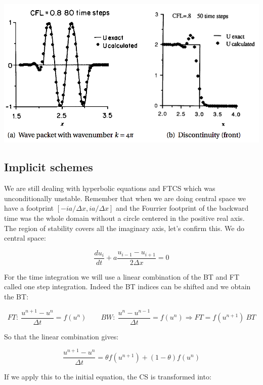 \begin{center}
\includegraphics[scale=0.5]{ch3/13}
\end{center}


\subsection{Implicit schemes}
We are still dealing with hyperbolic equations and FTCS which was unconditionally unstable. Remember that when we are doing central space we have a footprint $[-ia/\Delta x, ia/\Delta x]$ and the Fourrier footprint of the backward time was the whole domain without a circle centered in the positive real axis. The region of stability covers all the imaginary axis, let's confirm this. We do central space: 

\begin{equation}
\frac{du_i}{dt} + a \frac{u_{i-1}-u_{i+1}}{2\Delta x} = 0
\end{equation}

For the time integration we will use a linear combination of the BT and FT called one step integration. Indeed the BT indices can be shifted and we obtain the BT: 

\begin{equation}
FT: \ \frac{u^{n+1}- u^n}{\Delta t} = f(u^n) \qquad BW: \ \frac{u^{n}- u^{n-1}}{\Delta t} = f(u^n) \Rightarrow FT = f(u^{n+1})\ BT
\end{equation}

So that the linear combination gives:

\begin{equation}
\frac{u^{n+1}-u^n}{\Delta t} = \theta f(u^{n+1}) + (1-\theta)f(u^n)
\end{equation}

If we apply this to the initial equation, the CS is transformed into:

